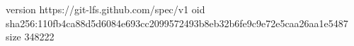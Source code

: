 version https://git-lfs.github.com/spec/v1
oid sha256:110fb4ca88d5d6084e693cc2099572493b8eb32b6fe9c9e72e5caa26aa1e5487
size 348222
